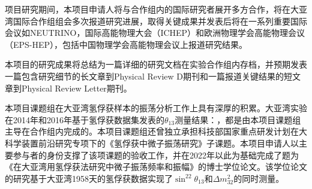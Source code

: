 \documentclass[a4paper,zihao=-4]{article}
\begin{document}
项目研究期间，本项目申请人将与合作组内的国际研究者展开多方合作，将在大亚湾国际合作组组会多次报道研究进展，取得关键成果并发表后将在一系列重要国际会议如NEUTRINO，国际高能物理大会（ICHEP）和欧洲物理学会高能物理会议（EPS-HEP），包括中国物理学会高能物理会议上报道研究结果。

本项目的研究成果将总结为一篇详细的研究文档在实验合作组内存档，并预期发表一篇包含研究细节的长文章到Physical Review D期刊和一篇报道关键结果的短文章到Physical Review Letter期刊。




本项目课题组在大亚湾氢俘获样本的振荡分析工作上具有深厚的积累。大亚湾实验在2014年和2016年基于氢俘获数据集发表的$\theta_{13}$测量结果：，都是由本项目课题组主导在合作组内完成的。本项目课题组还曾独立承担科技部国家重点研发计划在大科学装置前沿研究专项下的《氢俘获中微子振荡研究》子课题。本项目申请人以主要参与者的身份支撑了该项课题的验收工作，并在2022年以此为基础完成了题为《在大亚湾用氢俘获法研究中微子振荡频率和振幅》的博士学位论文。该学位论文的研究基于大亚湾1958天的氢俘获数据实现了$\sin^22\theta_{13}$和$\Delta m_{32}^2$的同时测量。 
\end{document}
